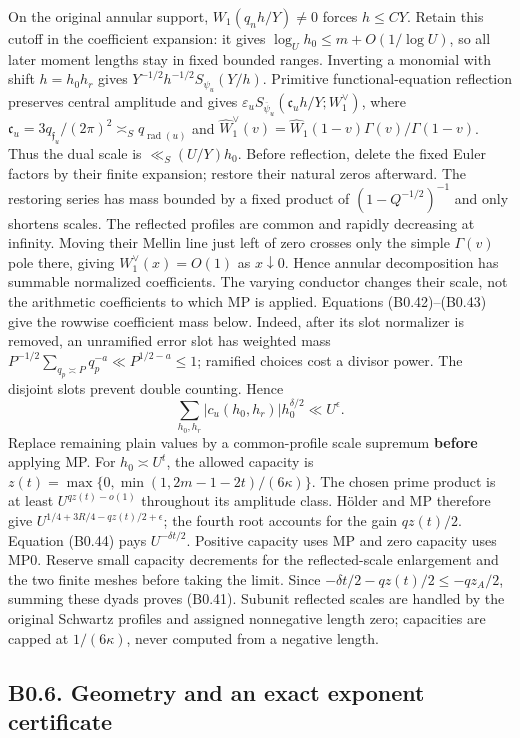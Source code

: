\documentclass[11pt,a4paper]{article}
\begin{document}
On the original annular support, \(W_1(q_nh/Y)\ne0\) forces
\(h\le C Y\). Retain this cutoff in the coefficient expansion: it gives
\(\log_Uh_0\le m+O(1/\log U)\), so all later moment lengths stay in
fixed bounded ranges. Inverting a monomial with shift \(h=h_0h_r\) gives
\(Y^{-1/2}h^{-1/2}S_{\psi_u}(Y/h)\). Primitive functional-equation
reflection preserves central amplitude and gives
\(\varepsilon_uS_{\overline\psi_u}(\mathfrak c_uh/Y;W_1^\vee)\), where
\(\mathfrak c_u=3q_{\mathfrak f_u}/(2\pi)^2\asymp_Sq_{\operatorname{rad}(u)}\)
and \(\widehat W_1^\vee(v)=\widehat W_1(1-v)\Gamma(v)/\Gamma(1-v)\).
Thus the dual scale is \(\ll_S(U/Y)h_0\). Before reflection, delete the
fixed Euler factors by their finite expansion; restore their natural
zeros afterward. The restoring series has mass bounded by a fixed
product of \((1-Q^{-1/2})^{-1}\) and only shortens scales. The reflected
profiles are common and rapidly decreasing at infinity. Moving their
Mellin line just left of zero crosses only the simple \(\Gamma(v)\) pole
there, giving \(W_1^\vee(x)=O(1)\) as \(x\downarrow0\). Hence annular
decomposition has summable normalized coefficients. The varying
conductor changes their scale, not the arithmetic coefficients to which
MP is applied. Equations (B0.42)--(B0.43) give the rowwise coefficient
mass below. Indeed, after its slot normalizer is removed, an unramified
error slot has weighted mass
\(P^{-1/2}\sum_{q_p\asymp P}q_p^{-a}\ll P^{1/2-a}\le1\); ramified
choices cost a divisor power. The disjoint slots prevent double
counting. Hence \[
\sum_{h_0,h_r}|c_u(h_0,h_r)|h_0^{\delta/2}\ll U^\epsilon.
\tag{B0.44}
\] Replace remaining plain values by a common-profile scale supremum
\textbf{before} applying MP. For \(h_0\asymp U^t\), the allowed capacity
is \(z(t)=\max\{0,\allowbreak{}\min(1,\allowbreak{}2m-1-2t)/(6\kappa)\}\). The chosen prime
product is at least \(U^{qz(t)-o(1)}\) throughout its amplitude class.
Hölder and MP therefore give \(U^{1/4+3R/4-qz(t)/2+\epsilon}\); the
fourth root accounts for the gain \(qz(t)/2\). Equation (B0.44) pays
\(U^{-\delta t/2}\). Positive capacity uses MP and zero capacity uses
MP0. Reserve small capacity decrements for the reflected-scale
enlargement and the two finite meshes before taking the limit. Since
\(-\delta t/2-qz(t)/2\le-qz_A/2\), summing these dyads proves (B0.41).
Subunit reflected scales are handled by the original Schwartz profiles
and assigned nonnegative length zero; capacities are capped at
\(1/(6\kappa)\), never computed from a negative length.

\hypertarget{b0.6.-geometry-and-an-exact-exponent-certificate}{%
\subsection{B0.6. Geometry and an exact exponent
certificate}\label{b0.6.-geometry-and-an-exact-exponent-certificate}}
\end{document}
